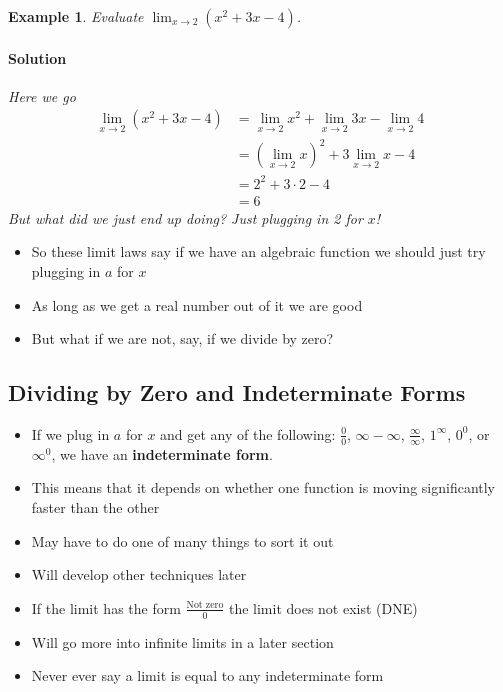 \documentclass[letterpaper, 11pt, openany]{book}
\theoremstyle{mytheoremstyle}
\theoremstyle{myexamplestyle}
\newtheorem{example}{Example}[section]
\newenvironment{solution}{\paragraph{\sffamily \smaller \fontseries{b}\selectfont Solution}}{\hfill\faSquare}
\begin{document}
\begin{example}\label{e:limit-justplugin}
    Evaluate $\displaystyle \lim_{x\to 2} \left( x^{2} + 3x - 4 \right)$.   
    \begin{solution}
        Here we go \faMeh
        \begin{align*}
            \lim_{x\to 2} \left( x^{2} + 3x - 4 \right)     &= \lim_{x\to 2} x^{2} + \lim_{x\to 2} 3x - \lim_{x\to 2} 4\\
                                                            &= \left(\lim_{x\to 2} x\right)^{2} + 3\lim_{x\to 2} x - 4\\
                                                            &= 2^2 + 3\cdot 2 - 4\\
                                                            &= 6
        \end{align*}
    But what did we just end up doing? Just plugging in 2 for $x$! \faMeh
    \end{solution}    
\end{example}
\begin{itemize}
    \item So these limit laws say if we have an algebraic function we should just try plugging in $a$ for $x$
    \item As long as we get a real number out of it we are good \faSmile
    \item But what if we are not, say, if we divide by zero? 
\end{itemize}
\subsection{Dividing by Zero and Indeterminate Forms}
\begin{itemize}
    \item If we plug in $a$ for $x$ and get any of the following: $\frac{0}{0}$, $\infty - \infty$, $\frac{\infty}{\infty}$, $1^{\infty}$, $0^{0}$, or $\infty^{0}$, we have an \textbf{indeterminate form}.
    \item This means that it depends on whether one function is moving significantly faster than the other
    \item May have to do one of many things to sort it out
    \item Will develop other techniques later
    \item If the limit has the form $\frac{\text{Not zero}}{0}$ the limit does not exist (DNE)
    \item Will go more into infinite limits in a later section
    \item[{\faExclamationTriangle[solid]}] Never ever say a limit is equal to any indeterminate form
\end{itemize}
\end{document}
